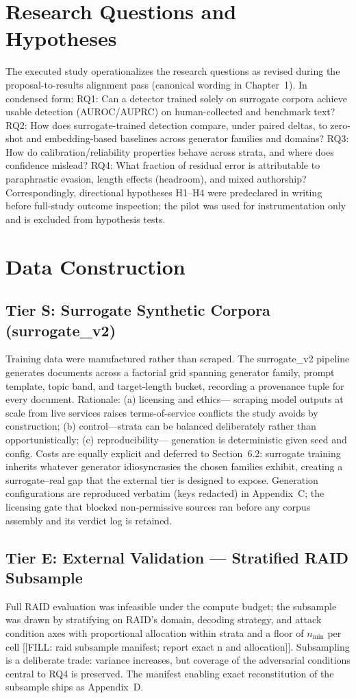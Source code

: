 \section{Research Questions and Hypotheses}
The executed study operationalizes the research questions as revised during
the proposal-to-results alignment pass (canonical wording in Chapter~1).
In condensed form:
RQ1: Can a detector trained solely on surrogate corpora achieve usable
detection (AUROC/AUPRC) on human-collected and benchmark text?
RQ2: How does surrogate-trained detection compare, under paired deltas, to
zero-shot and embedding-based baselines across generator families and
domains?
RQ3: How do calibration/reliability properties behave across strata, and
where does confidence mislead?
RQ4: What fraction of residual error is attributable to paraphrastic
evasion, length effects (headroom), and mixed authorship?
Correspondingly, directional hypotheses H1--H4 were predeclared in writing
before full-study outcome inspection; the pilot was used for
instrumentation only and is excluded from hypothesis tests.

\section{Data Construction}
\subsection{Tier S: Surrogate Synthetic Corpora (surrogate\_v2)}
Training data were manufactured rather than scraped. The surrogate\_v2
pipeline generates documents across a factorial grid spanning generator
family, prompt template, topic band, and target-length bucket, recording a
provenance tuple for every document. Rationale: (a) licensing and ethics---
scraping model outputs at scale from live services raises terms-of-service
conflicts the study avoids by construction; (b) control---strata can be
balanced deliberately rather than opportunistically; (c) reproducibility---
generation is deterministic given seed and config. Costs are equally
explicit and deferred to Section~6.2: surrogate training inherits whatever
generator idiosyncrasies the chosen families exhibit, creating a
surrogate--real gap that the external tier is designed to expose.
Generation configurations are reproduced verbatim (keys redacted) in
Appendix~C; the licensing gate that blocked non-permissive sources ran
before any corpus assembly and its verdict log is retained.

\subsection{Tier E: External Validation --- Stratified RAID Subsample}
Full RAID evaluation was infeasible under the compute budget; the subsample
was drawn by stratifying on RAID's domain, decoding strategy, and attack
condition axes with proportional allocation within strata and a floor of
$n_{\min}$ per cell [[FILL: raid subsample manifest; report exact n and
allocation]]. Subsampling is a deliberate trade: variance increases, but
coverage of the adversarial conditions central to RQ4 is preserved. The
manifest enabling exact reconstitution of the subsample ships as
Appendix~D.

